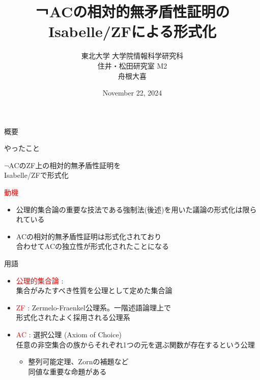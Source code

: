 \documentclass[17pt]{beamer}
\title{￢ACの相対的無矛盾性証明のIsabelle/ZFによる形式化}
\author{東北大学 大学院情報科学研究科\\ 住井・松田研究室 M2\\ 舟根大喜}
\date{November 22, 2024}
\begin{document}
\maketitle

\begin{frame}{概要}
    \vspace{-5pt}
    \begin{itembox}[l]{やったこと}
        \begin{center}
        \vspace{-3pt}
        $\neg$ACのZF上の相対的無矛盾性証明を\\
        Isabelle/ZFで形式化
        \vspace{-3pt}
        \end{center}
    \end{itembox}
    \vspace{-5pt}
    {\small
    \textcolor{red}{動機}
    \begin{itemize}[itemsep=1pt]
    \vspace{-5pt}
        \item 公理的集合論の重要な技法である強制法(後述)を用いた議論の形式化は限られている
        \item ACの相対的無矛盾性証明は形式化されており\\
        合わせてACの独立性が形式化されたことになる
    \end{itemize}}
\end{frame}

\begin{frame}{用語}\,
    \vspace{-20pt}
    {\small 
        \begin{itemize}[itemsep=8pt]
            \item \textcolor{red}{公理的集合論} : \\
            集合がみたすべき性質を公理として定めた集合論
            \item \textcolor{red}{ZF} : 
            Zermelo-Fraenkel公理系。一階述語論理上で\\
            形式化されたよく採用される公理系
            \item \textcolor{red}{AC} : 選択公理 (Axiom of Choice)\\
            任意の非空集合の族からそれぞれ1つの元を選ぶ関数が存在するという公理
            \begin{itemize} 
                \item 整列可能定理、Zornの補題など\\同値な重要な命題がある
            \end{itemize}

        \end{itemize}
    }
\end{frame}
\end{document}
